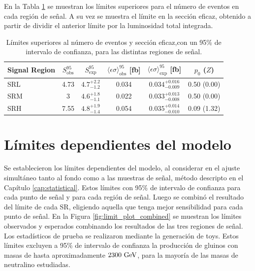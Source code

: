 En la Tabla \ref{tab:model_indep_ul} se muestran los límites superiores para el número de eventos en cada región de señal. A su vez se muestra el límite en la sección eficaz, obtenido a partir de dividir el anterior límite por la luminosidad total integrada. 


\begin{table}[!h]
  \centering
  \caption{Límites superiores al número de eventos y sección eficaz,con un 95\% de intervalo de confianza, para las distintas regiones de señal. }

    \begin{tabular}{lccccc}
      \hline
      \hline
      Signal Region  & $S_{\mathrm{obs}}^{95}$  & $S_{\mathrm{exp}}^{95}$ & $\langle\epsilon{\sigma}\rangle_{\mathrm{obs}}^{95}$ [fb]  & $\langle\epsilon{\sigma}\rangle_{\mathrm{exp}}^{95}$ [fb] & $p_{0}$ ($Z$)\\
      \hline
      \hline
      SRL     &   4.73   &   $4.7^{+2.2}_{-1.2}$ &  0.034   &   $0.034^{+0.016}_{-0.009}$    &    0.50 (0.00)  \\ 
      SRM    &   3       &   $4.6^{+1.8}_{-1.1}$ &  0.022   &   $0.033^{+0.013}_{-0.008}$     &    0.50 (0.00)  \\ 
      SRH     &   7.55   &   $4.8^{+1.9}_{-1.4}$ &  0.054   &   $0.035^{+0.014}_{-0.010}$    &    0.09 (1.32)  \\
      \hline
      \hline
    \end{tabular}
    \label{tab:model_indep_ul}
  \end{table}



\section{Límites dependientes del modelo}


Se establecieron los límites dependientes del modelo, al considerar en el ajuste simultáneo tanto al fondo como a las muestras de señal, método descripto en el Capítulo \ref{cap:statistical}. Estos límites con 95\% de intervalo de confianza para cada punto de señal y para cada región de señal. Luego se combinó el resultado del límite de cada SR, eligiendo aquella que tenga mejor sensibilidad para cada punto de señal. En la Figura \ref{fig:limit_plot_combined} se muestran los límites observados y esperados combinando los resultados de las tres regiones de señal. Los estadísticos de prueba se realizaron mediante la generación de  toys. Estos límites excluyen a 95\% de intervalo de confianza la producción de gluinos con masas de hasta aproximadamente $2300\ \text{GeV}$, para la mayoría de las masas de neutralino estudiadas.


